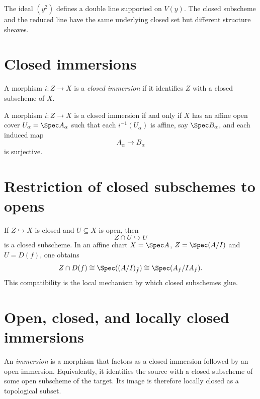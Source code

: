 

\begin{example}\label{ex:vi22-expand-02}
The ideal $(y^2)$ defines a double line supported on $V(y)$.  The closed subscheme and the reduced line have the same underlying closed set but different structure sheaves.
\end{example}
\section{Closed immersions}
A morphism $i:Z\to X$ is a \emph{closed immersion} if it identifies $Z$ with a closed
subscheme of $X$.

\begin{theorem}\label{thm:vi22-closed-affine-local}
A morphism $i:Z\to X$ is a closed immersion if and only if $X$ has an affine open cover
$U_\alpha=\Spec A_\alpha$ such that each $i^{-1}(U_\alpha)$ is affine, say
$\Spec B_\alpha$, and each induced map
\[
 A_\alpha\longrightarrow B_\alpha
\]
is surjective.
\end{theorem}



\section{Restriction of closed subschemes to opens}
If $Z\hookrightarrow X$ is closed and $U\subseteq X$ is open, then
\[
 Z\cap U\hookrightarrow U
\]
is a closed subscheme.  In an affine chart $X=\Spec A$, $Z=\Spec(A/I)$ and
$U=D(f)$, one obtains
\[
 Z\cap D(f)\cong \Spec((A/I)_{\bar f})
 \cong \Spec(A_f/IA_f).
\]
This compatibility is the local mechanism by which closed subschemes glue.



\section{Open, closed, and locally closed immersions}
An \emph{immersion} is a morphism that factors as a closed immersion followed by an open
immersion.  Equivalently, it identifies the source with a closed subscheme of some open
subscheme of the target.  Its image is therefore locally closed as a topological subset.

